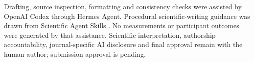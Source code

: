 Drafting, source inspection, formatting and consistency checks were assisted by OpenAI Codex through Hermes Agent. Procedural scientific-writing guidance was drawn from Scientific Agent Skills \cite{skills}. No measurements or participant outcomes were generated by that assistance. Scientific interpretation, authorship accountability, journal-specific AI disclosure and final approval remain with the human author; submission approval is pending.

